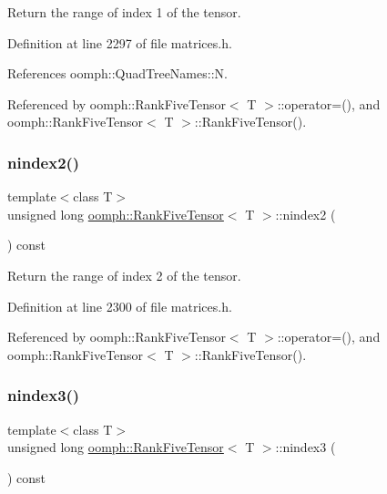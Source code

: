 Return the range of index 1 of the tensor. 



Definition at line 2297 of file matrices.\+h.



References oomph\+::\+Quad\+Tree\+Names\+::N.



Referenced by oomph\+::\+Rank\+Five\+Tensor$<$ T $>$\+::operator=(), and oomph\+::\+Rank\+Five\+Tensor$<$ T $>$\+::\+Rank\+Five\+Tensor().

\mbox{\label{classoomph_1_1RankFiveTensor_a92d2a0f9ffc41e75cf5fffa9cfd601fd}} 
\subsubsection{\texorpdfstring{nindex2()}{nindex2()}}
{\footnotesize\ttfamily template$<$class T$>$ \\
unsigned long \hyperlink{classoomph_1_1RankFiveTensor}{oomph\+::\+Rank\+Five\+Tensor}$<$ T $>$\+::nindex2 (\begin{DoxyParamCaption}{ }\end{DoxyParamCaption}) const\hspace{0.3cm}{\ttfamily [inline]}}



Return the range of index 2 of the tensor. 



Definition at line 2300 of file matrices.\+h.



Referenced by oomph\+::\+Rank\+Five\+Tensor$<$ T $>$\+::operator=(), and oomph\+::\+Rank\+Five\+Tensor$<$ T $>$\+::\+Rank\+Five\+Tensor().

\mbox{\label{classoomph_1_1RankFiveTensor_a720c024bccf0b33f2f3bd6367611a4fa}} 
\subsubsection{\texorpdfstring{nindex3()}{nindex3()}}
{\footnotesize\ttfamily template$<$class T$>$ \\
unsigned long \hyperlink{classoomph_1_1RankFiveTensor}{oomph\+::\+Rank\+Five\+Tensor}$<$ T $>$\+::nindex3 (\begin{DoxyParamCaption}{ }\end{DoxyParamCaption}) const\hspace{0.3cm}{\ttfamily [inline]}}



